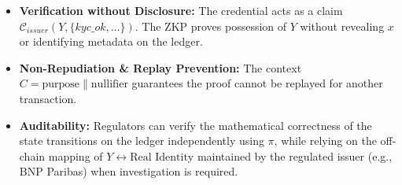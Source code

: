 \documentclass[11pt,a4paper]{article}
\begin{document}
\begin{itemize}
    \item \textbf{Verification without Disclosure:} The credential acts as a claim $\mathcal{C}_{issuer}(Y, \{kyc\_ok, \dots\})$. The ZKP proves possession of $Y$ without revealing $x$ or identifying metadata on the ledger.
    \item \textbf{Non-Repudiation \& Replay Prevention:} The context $C = \text{purpose} \parallel \text{nullifier}$ guarantees the proof cannot be replayed for another transaction.
    \item \textbf{Auditability:} Regulators can verify the mathematical correctness of the state transitions on the ledger independently using $\pi$, while relying on the off-chain mapping of $Y \leftrightarrow \text{Real Identity}$ maintained by the regulated issuer (e.g., BNP Paribas) when investigation is required.
\end{itemize}
\end{document}
